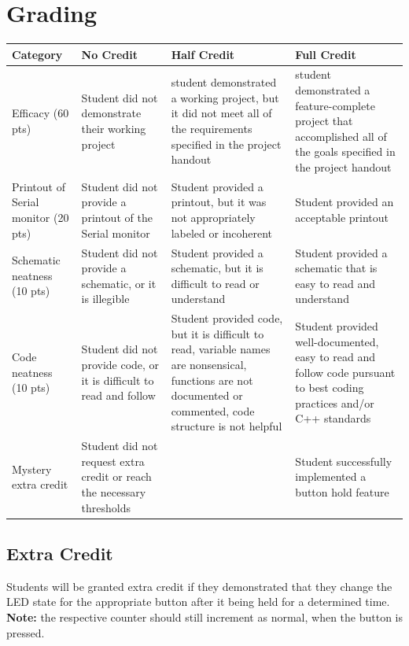 \documentclass{article}
\begin{document}
\section*{Grading}
\begin{tabular}{ | p{1in} | p{1.75in} | p{1.75in} | p{1.75in} | }
    \hline
    \textbf{Category} & \textbf{No Credit} & \textbf{Half Credit} & \textbf{Full Credit} \\

    \hline
    Efficacy (60 pts) & 
    Student did not demonstrate their working project & 
    student demonstrated a working project, but it did not meet all of the requirements specified in the project handout & 
    student demonstrated a feature-complete project that accomplished all of the goals specified in the project handout \\
    \hline
    Printout of Serial monitor (20 pts) & 
    Student did not provide a printout of the Serial monitor &
    Student provided a printout, but it was not appropriately labeled or incoherent&
    Student provided an acceptable printout \\
    \hline
    Schematic neatness (10 pts) & 
    Student did not provide a schematic, or it is illegible &
    Student provided a schematic, but it is difficult to read or understand &
    Student provided a schematic that is easy to read and understand \\
    \hline
    Code neatness (10 pts) & 
    Student did not provide code, or it is difficult to read and follow &
    Student provided code, but it is difficult to read, variable names are nonsensical, functions are not documented or commented, code structure is not helpful &
    Student provided well-documented, easy to read and follow code pursuant to best coding practices and/or C++ standards \\
    \hline
    Mystery extra credit &
    Student did not request extra credit or reach the necessary thresholds & 
    &
    Student successfully implemented a button hold feature \\

    \hline
\end{tabular}

    \subsection*{Extra Credit}
    Students will be granted extra credit if they demonstrated that they change the LED state for the appropriate button after it being held for a determined time. 
    \textbf{Note:} the respective counter should still increment as normal, when the button is pressed.
\end{document}
